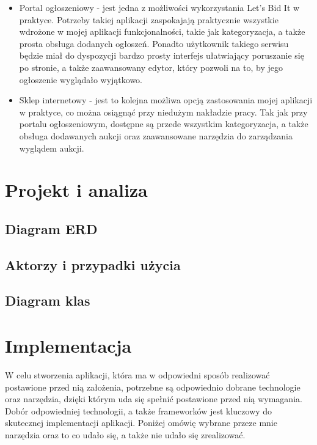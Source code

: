 \documentclass[brudnopis]{xmgr}
\begin{document}
\begin{itemize}

\item Portal ogłoszeniowy - jest jedna z możliwości wykorzystania Let's Bid It w praktyce. Potrzeby takiej aplikacji zaspokajają praktycznie wszystkie wdrożone w mojej aplikacji funkcjonalności, takie jak kategoryzacja, a także prosta obsługa dodanych ogłoszeń. Ponadto użytkownik takiego  serwisu będzie miał do dyspozycji bardzo prosty interfejs ułatwiający poruszanie się po stronie, a także zaawansowany edytor, który pozwoli na to, by jego ogłoszenie wyglądało wyjątkowo.

\item Sklep internetowy - jest to kolejna możliwa opcją zastosowania mojej aplikacji w praktyce, co można osiągnąć przy niedużym nakładzie pracy. Tak jak przy portalu ogłoszeniowym, dostępne są przede wszystkim kategoryzacja, a także obsługa dodawanych aukcji oraz zaawansowane narzędzia do zarządzania wyglądem aukcji.

\end{itemize}

\chapter{Projekt i analiza}

\section{Diagram ERD}

\section{Aktorzy i przypadki użycia}

\section{Diagram klas}

\chapter{Implementacja}
W celu stworzenia aplikacji, która ma w odpowiedni sposób realizować postawione przed nią
założenia, potrzebne są odpowiednio dobrane technologie oraz narzędzia, dzięki którym uda się 
spełnić postawione przed nią wymagania. Dobór odpowiedniej technologii, a także frameworków 
jest kluczowy do skutecznej implementacji aplikacji. Poniżej omówię wybrane przeze mnie narzędzia oraz to co udało się, a także nie udało się zrealizować.
\end{document}
